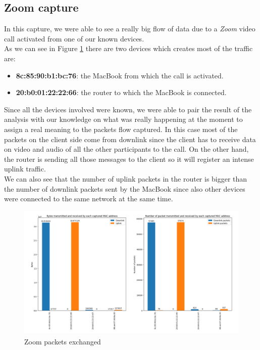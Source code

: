 \subsection{Zoom capture}
In this capture, we were able to see a really big flow of data due to a \textit{Zoom} video call activated from 
one of our known devices.\\ 
As we can see in Figure \ref{fig:Zoom_packets} there are two devices which creates most of the traffic are:
\begin{itemize}
    \item \textbf{8c:85:90:b1:bc:76}: the MacBook from which the call is activated. 
    \item \textbf{20:b0:01:22:22:66}: the router to which the MacBook is connected. 
\end{itemize}
Since all the devices involved were known, we were able to pair the result of the analysis with our 
knowledge on what was really happening at the moment to assign a real meaning to the packets flow 
captured. In this case most of the packets on the client side come from downlink since the client 
has to receive data on video and audio of all the other participants to the call. On the other hand,
the router is sending all those messages to the client so it will register an intense uplink traffic.\\
We can also see that the number of uplink packets in the router is bigger than the number of downlink
packets sent by the MacBook since also other devices were connected to the same network at the same
time. 
\begin{figure}[h]
    \includegraphics[width=\textwidth]{Graphs/Zoom_bytes_packets.png}
    \caption{Zoom packets exchanged}
    \label{fig:Zoom_packets}
\end{figure}


